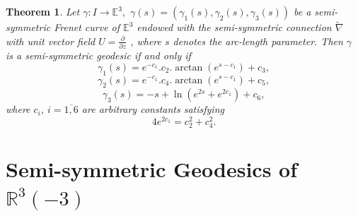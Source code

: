 \documentclass{amsart}
\theoremstyle{plain}
\newtheorem{theorem}{Theorem}
\theoremstyle{definition}
\theoremstyle{remark}
\numberwithin{equation}{section}
\begin{document}
\begin{theorem}
Let $\gamma :I\rightarrow \mathbb{E}^{3},$ $\gamma (s)=\left( \gamma
_{1}(s),\gamma _{2}(s),\gamma _{3}(s)\right) $ be a semi-symmetric Frenet
curve of $\mathbb{E}^{3}$ endowed with the semi-symmetric connection $%
\widetilde{\nabla }$ with unit vector field $U=\frac{\partial }{\partial z}$%
, where $s$ denotes the arc-length parameter. Then $\gamma $ is a
semi-symmetric geodesic if and only if%
\begin{equation*}
\gamma _{1}(s)=e^{-c_{1}}.c_{2}.\arctan \left( e^{s-c_{1}}\right) +c_{3},
\end{equation*}%
\begin{equation*}
\gamma _{2}(s)=e^{-c_{1}}.c_{4}.\arctan \left( e^{s-c_{1}}\right) +c_{5},
\end{equation*}%
\begin{equation*}
\gamma _{3}(s)=-s+\ln \left( e^{2s}+e^{2c_{1}}\right) +c_{6},
\end{equation*}%
where $c_{i}$, $i=\overline{1,6}$ are arbitrary constants satisfying 
\begin{equation*}
4e^{2c_{1}}=c_{2}^{2}+c_{4}^{2}.
\end{equation*}
\end{theorem}

\section{\label{sect-geodesic-R3(-3)}Semi-symmetric Geodesics of $\mathbb{R}%
^{3}(-3)$}
\end{document}
